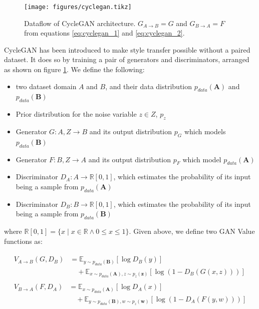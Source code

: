 \documentclass[12pt,a4paper,]{report}
\providecommand{\tightlist}{%
  \setlength{\itemsep}{0pt}\setlength{\parskip}{0pt}}
\begin{document}
\begin{figure}[h]
    \texttt{[image: figures/cyclegan.tikz]}
\centering
\caption{Dataflow of CycleGAN architecture. $G_{A \rightarrow B} = G$ and $G_{B \rightarrow A} = F$ from equations \ref{eq:cyclegan_1} and \ref{eq:cyclegan_2}. \label{fig:cyclegan}}
\end{figure}

CycleGAN has been introduced to make style transfer possible without a
paired dataset. It does so by training a pair of generators and
discriminators, arranged as shown on figure \ref{fig:cyclegan}. We
define the following:

\begin{itemize}
\tightlist
\item
  two dataset domain \(A\) and \(B\), and their data distribution
  \(p_{data}(\mathbf{A})\) and \(p_{data}(\mathbf{B})\)
\item
  Prior distribution for the noise variable \(z \in Z\), \(p_z\)
\item
  Generator \(G: A, Z \rightarrow B\) and its output distribution
  \(p_G\) which models \(p_{data}(\mathbf{B})\)
\item
  Generator \(F: B, Z \rightarrow A\) and its output distribution
  \(p_F\) which model \(p_{data}(\mathbf{A})\)
\item
  Discriminator \(D_{A}: A \rightarrow \mathbb{R}[0, 1]\), which
  estimates the probability of its input being a sample from
  \(p_{data}(\mathbf{A})\)
\item
  Discriminator \(D_{B}: B \rightarrow \mathbb{R}[0, 1]\), which
  estimates the probability of its input being a sample from
  \(p_{data}(\mathbf{B})\)
\end{itemize}

where
\(\mathbb{R}[0, 1] = \{x \mid x \in \mathbb{R} \land 0 \leq x \leq 1 \}\).
Given above, we define two GAN Value functions as:

\begin{align}
    \begin{split}
        V_{A \rightarrow B}(G, D_B) &= \mathbb{E}_{y \sim p_{data}(\mathbf{B})}[ \log D_B(y)]  \\
        &\quad + \mathbb{E}_{x \sim p_{data}(\mathbf{A}), z \sim p_{z}(\mathbf{z})} [\log (1 - D_B(G(x, z)))] \label{eq:cyclegan_1}
    \end{split} \\
    \begin{split}
        V_{B \rightarrow A}(F, D_A) &= \mathbb{E}_{x \sim p_{data}(\mathbf{A})}[ \log D_A(x)]  \\
        &\quad + \mathbb{E}_{y \sim p_{data}(\mathbf{B}), w \sim p_{z}(\mathbf{w})} [\log (1 - D_A(F(y, w)))] \label{eq:cyclegan_2}
    \end{split} 
\end{align}
\end{document}
